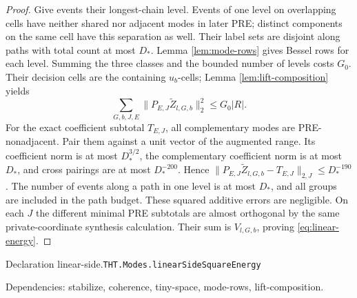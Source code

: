 \documentclass[11pt]{article}
\theoremstyle{definition}
\numberwithin{equation}{section}
\newcommand{\bp}[3]{\par\smallskip\begingroup\footnotesize
\noindent\hypertarget{bp:#1}{\textsf{Declaration #1.}}\quad\nolinkurl{#2}\par
\noindent\textsf{Dependencies:} #3.\par\endgroup\smallskip}
\begin{document}
\begin{proof}
Give events their longest-chain level. Events of one level on overlapping cells have neither shared nor adjacent modes in later PRE; distinct components on the same cell have this separation as well. Their label sets are disjoint along paths with total count at most $D_*$. Lemma \ref{lem:mode-rows} gives Bessel rows for each level. Summing the three classes and the bounded number of levels costs $G_0$. Their decision cells are the containing $u_b$-cells; Lemma \ref{lem:lift-composition} yields
\[
 \sum_{G,b,J,E}\|P_{E,J}\widetilde Z_{l,G,b}\|_2^2\le G_0|R|.
\]
For the exact coefficient subtotal $T_{E,J}$, all complementary modes are PRE-nonadjacent. Pair them against a unit vector of the augmented range. Its coefficient norm is at most $D_*^{3/2}$, the complementary coefficient norm is at most $D_*$, and cross pairings are at most $D_*^{-200}$. Hence $\|P_{E,J}\widetilde Z_{l,G,b}-T_{E,J}\|_{2,J}\le D_*^{-190}$. The number of events along a path in one level is at most $D_*$, and all groups are included in the path budget. These squared additive errors are negligible. On each $J$ the different minimal PRE subtotals are almost orthogonal by the same private-coordinate synthesis calculation. Their sum is $V_{l,G,b}$, proving \eqref{eq:linear-energy}. 
\end{proof}
\bp{linear-side}{THT.Modes.linearSideSquareEnergy}{stabilize, coherence, tiny-space, mode-rows, lift-composition}
\end{document}
